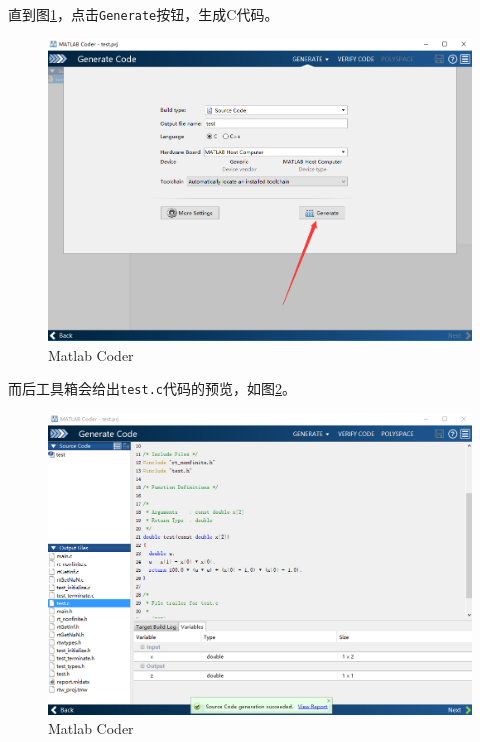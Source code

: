 \documentclass[]{ctexbook}
\theoremstyle{definition}
\theoremstyle{definition}
\theoremstyle{definition}
\theoremstyle{remark}
\begin{document}
直到图\ref{fig:coder6}，点击\texttt{Generate}按钮，生成C代码。

\begin{figure}

{\centering \includegraphics[width=0.95\linewidth]{img/coder6} 

}

\caption{Matlab Coder}\label{fig:coder6}
\end{figure}

而后工具箱会给出\texttt{test.c}代码的预览，如图\ref{fig:coder7}。

\begin{figure}

{\centering \includegraphics[width=0.95\linewidth]{img/coder7} 

}

\caption{Matlab Coder}\label{fig:coder7}
\end{figure}
\end{document}
